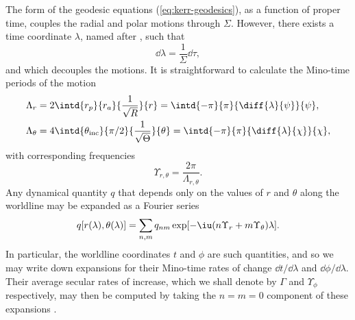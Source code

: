 The form of the geodesic equations (\ref{eq:kerr-geodesics}), as a function of proper time, couples the radial and polar motions through $\Sigma$. However, there exists a time coordinate $\lambda$, named after \citet{mino_perturbative_2003}, such that
\begin{equation}
\dd \lambda = \frac1{\Sigma} \dd \tau,
\end{equation}
and which decouples the motions. It is straightforward to calculate the Mino-time periods of the motion
\begin{subequations}\begin{align}
\Lambda_r &= 2 \intd{r_p}{r_a}{\frac1{\sqrt{R}}}{r} = \intd{-\pi}{\pi}{\diff{\lambda}{\psi}}{\psi},\\
\Lambda_\theta &= 4 \intd{\theta_\mathrm{inc}}{\pi/2}{\frac1{\sqrt{\Theta}}}{\theta} = \intd{-\pi}{\pi}{\diff{\lambda}{\chi}}{\chi},
\end{align}\end{subequations}
with corresponding frequencies
\begin{equation}
\Upsilon_{r,\theta} = \frac{2\pi}{\Lambda_{r,\theta}}.
\end{equation}
Any dynamical quantity $q$ that depends only on the values of $r$ and $\theta$ along the worldline may be expanded as a Fourier series
\begin{equation}
q[r(\lambda),\theta(\lambda)] = \sum_{n,m} q_{nm} \exp[-\iu(n\Upsilon_r+m\Upsilon_\theta)\lambda].
\end{equation}
In particular, the worldline coordinates $t$ and $\phi$ are such quantities, and so we may write down expansions for their Mino-time rates of change $\dd t/\dd\lambda$ and $\dd \phi / \dd\lambda$. Their average secular rates of increase, which we shall denote by $\Gamma$ and $\Upsilon_\phi$ respectively, may then be computed by taking the $n=m=0$ component of these expansions \citep{drasco_rotating_2004}.

